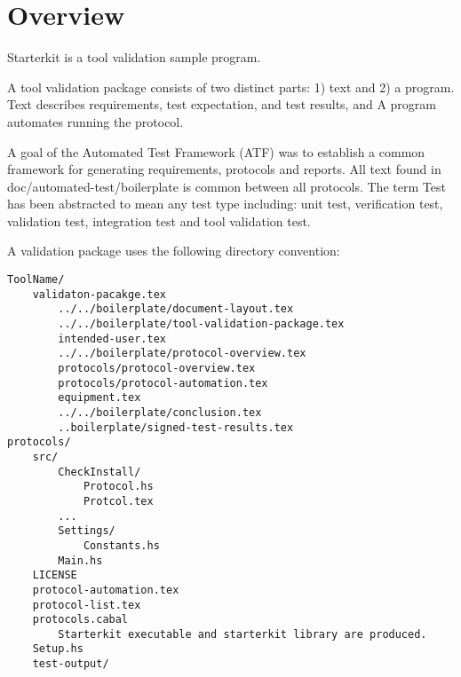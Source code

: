\section{Overview}
Starterkit is a tool validation sample program.

A tool validation package consists of two distinct parts: 1) text and 2) a
program. Text describes requirements, test expectation, and test results, and
A program automates running the protocol.

A goal of the Automated Test Framework (ATF) was to establish a common framework
for generating requirements, protocols and reports.  All text found in
doc/automated-test/boilerplate is common between all protocols.  The term
Test has been abstracted to mean any test type including: unit test,
verification test, validation test, integration test and tool validation test.

A validation package uses the following directory convention:

\begin{verbatim}
ToolName/
    validaton-pacakge.tex
        ../../boilerplate/document-layout.tex
        ../../boilerplate/tool-validation-package.tex
        intended-user.tex
        ../../boilerplate/protocol-overview.tex
        protocols/protocol-overview.tex
        protocols/protocol-automation.tex
        equipment.tex
        ../../boilerplate/conclusion.tex
        ..boilerplate/signed-test-results.tex
protocols/
    src/
        CheckInstall/
            Protocol.hs
            Protcol.tex
        ...
        Settings/
            Constants.hs
        Main.hs
    LICENSE
    protocol-automation.tex
    protocol-list.tex
    protocols.cabal
        Starterkit executable and starterkit library are produced.
    Setup.hs
    test-output/
\end{verbatim}
